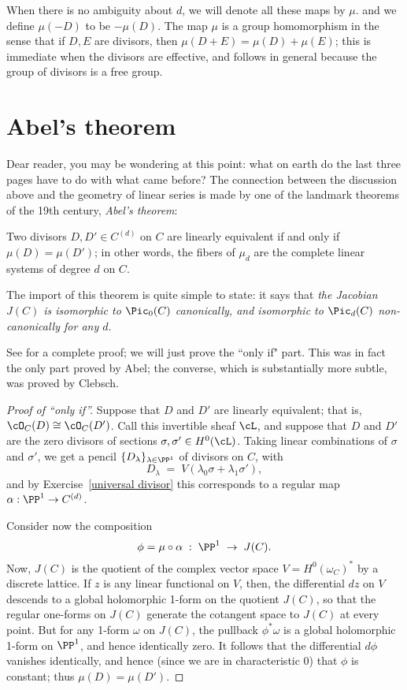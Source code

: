 When there is no ambiguity about $d$, we will denote all these maps  by $\mu$.  and  
we define $\mu(-D)$ to be $-\mu(D)$. 
The map $\mu$ is a group homomorphism in the sense that if $D, E$ are divisors, then
$\mu (D+E) = \mu(D) + \mu(E)$; this is immediate when the divisors are effective, and 
follows in general because the group of divisors is a free group.

\section{Abel's theorem}

Dear reader, you may be wondering at this point: what on earth do the last three pages have to do with what came before? The connection between the discussion above and the geometry of linear series is made by one of the landmark theorems of the 19th century, \emph{Abel's theorem}:

\begin{theorem}
Two divisors $D, D' \in C^{(d)}$ on $C$ are linearly equivalent if and only if $\mu(D) = \mu(D')$; in other words, the fibers of $\mu_d$ are the complete linear systems of degree $d$ on $C$.
\end{theorem}

The import of this theorem is quite simple to state: it says that \emph{the Jacobian $J(C)$ is isomorphic to $\Pic_0(C)$ canonically, and isomorphic to $\Pic_d(C)$ non-canonically for any $d$}.

See \cite[Section 2.2]{GH}  for a complete proof; we will just prove the ``only if" part. This was in fact the only part proved by Abel; the converse, which is substantially more subtle, was proved by Clebsch.

\begin{proof}[Proof of ``only if'']
Suppose that $D$ and $D'$ are linearly equivalent; that is, $\cO_C(D) \cong \cO_C(D')$. Call this invertible sheaf $\cL$, and suppose that $D$ and $D'$ are the zero divisors of sections $\sigma, \sigma' \in H^0(\cL)$.
Taking linear combinations of $\sigma$ and $\sigma'$, we get a pencil $\{D_\lambda\}_{\lambda \in \PP^1}$ of divisors on $C$, with
$$
D_\lambda \; = \; V(\lambda_0\sigma + \lambda_1\sigma'),
$$
and by Exercise~\ref{universal divisor} this corresponds to a regular map $\alpha : \PP^1 \to C^{(d)}$. 

Consider now the composition
$$
\phi = \mu \circ \alpha \; : \; \PP^1 \; \to \; J(C).
$$
Now, $J(C)$ is the quotient of the complex vector space $V = H^0(\omega_C)^*$ by a discrete lattice. If $z$ is any linear functional on $V$, then, the differential $dz$  on $V$ descends to a global holomorphic 1-form on the quotient $J(C)$, so that the regular one-forms on $J(C)$ generate the cotangent space to $J(C)$ at every point. But for any 1-form $\omega$ on $J(C)$, the pullback $\phi^*\omega$ is a global holomorphic 1-form on $\PP^1$, and hence identically zero. It follows that the differential $d\phi$ vanishes identically, and hence (since we are in characteristic 0) that $\phi$ is constant; thus $\mu(D) = \mu(D')$.
\end{proof}

